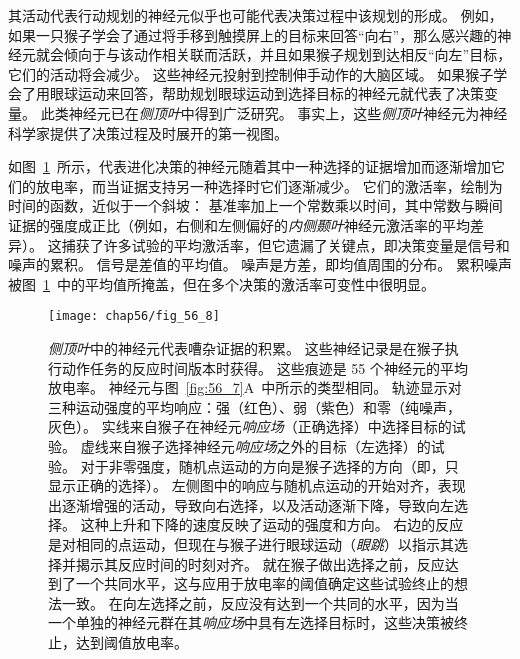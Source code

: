 其活动代表行动规划的神经元似乎也可能代表决策过程中该规划的形成。
例如，如果一只猴子学会了通过将手移到触摸屏上的目标来回答“向右”，那么感兴趣的神经元就会倾向于与该动作相关联而活跃，并且如果猴子规划到达相反“向左”目标，它们的活动将会减少。
这些神经元投射到控制伸手动作的大脑区域。
如果猴子学会了用眼球运动来回答，帮助规划眼球运动到选择目标的神经元就代表了决策变量。
此类神经元已在\textit{侧顶叶}中得到广泛研究。
事实上，这些\textit{侧顶叶}神经元为神经科学家提供了决策过程及时展开的第一视图。


如图~\ref{fig:56_8}~所示，代表进化决策的神经元随着其中一种选择的证据增加而逐渐增加它们的放电率，而当证据支持另一种选择时它们逐渐减少。
它们的激活率，绘制为时间的函数，近似于一个斜坡：
基准率加上一个常数乘以时间，其中常数与瞬间证据的强度成正比（例如，右侧和左侧偏好的\textit{内侧颞叶}神经元激活率的平均差异）。
这捕获了许多试验的平均激活率，但它遗漏了关键点，即决策变量是信号和噪声的累积。
信号是差值的平均值。
噪声是方差，即均值周围的分布。
累积噪声被图~\ref{fig:56_8}~中的平均值所掩盖，但在多个决策的激活率可变性中很明显。


\begin{figure}[htbp]
	\centering
	\texttt{[image: chap56/fig\_56\_8]}
	\caption{\textit{侧顶叶}中的神经元代表嘈杂证据的积累。
		这些神经记录是在猴子执行动作任务的反应时间版本时获得。
		这些痕迹是 55 个神经元的平均放电率。
		神经元与图~\ref{fig:56_7}A~中所示的类型相同。
		轨迹显示对三种运动强度的平均响应：强（红色）、弱（紫色）和零（纯噪声，灰色）。
		实线来自猴子在神经元\textit{响应场}（正确选择）中选择目标的试验。
		虚线来自猴子选择神经元\textit{响应场}之外的目标（左选择）的试验。
		对于非零强度，随机点运动的方向是猴子选择的方向（即，只显示正确的选择）。
		左侧图中的响应与随机点运动的开始对齐，表现出逐渐增强的活动，导致向右选择，以及活动逐渐下降，导致向左选择。
		这种上升和下降的速度反映了运动的强度和方向。
		右边的反应是对相同的点运动，但现在与猴子进行眼球运动（\textit{眼跳}）以指示其选择并揭示其反应时间的时刻对齐。
		就在猴子做出选择之前，反应达到了一个共同水平，这与应用于放电率的阈值确定这些试验终止的想法一致。
		在向左选择之前，反应没有达到一个共同的水平，因为当一个单独的神经元群在其\textit{响应场}中具有左选择目标时，这些决策被终止，达到阈值放电率\cite{roitman2002response}。}
	\label{fig:56_8}
\end{figure}


